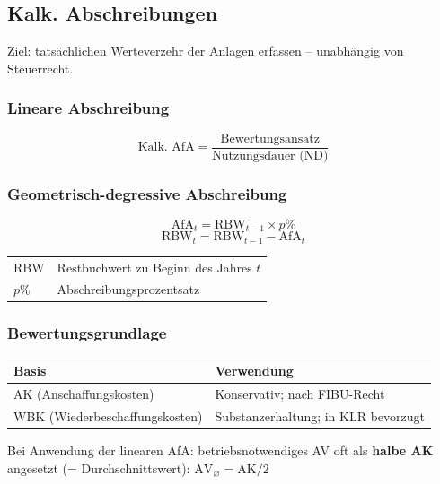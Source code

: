 \documentclass[10pt,a4paper]{article}
\begin{document}
\begin{multicols}{2}

\subsection{Kalk. Abschreibungen}

Ziel: tatsächlichen Werteverzehr der Anlagen erfassen -- unabhängig von Steuerrecht.

\subsubsection{Lineare Abschreibung}
\begin{formelbox}
\[
\text{Kalk. AfA} = \frac{\text{Bewertungsansatz}}{\text{Nutzungsdauer (ND)}}
\]
\end{formelbox}

\subsubsection{Geometrisch-degressive Abschreibung}
\begin{formelbox}
\[
\text{AfA}_t = \text{RBW}_{t-1} \times p\%
\]
\[
\text{RBW}_t = \text{RBW}_{t-1} - \text{AfA}_t
\]
\end{formelbox}

\begin{tabular}{|L{2cm}|L{5cm}|}
\hline
RBW & Restbuchwert zu Beginn des Jahres $t$ \\
$p\%$ & Abschreibungsprozentsatz \\
\hline
\end{tabular}

\subsubsection{Bewertungsgrundlage}
\begin{tabular}{|L{3.2cm}|L{3.6cm}|}
\hline
{}
\textbf{Basis} & \textbf{Verwendung} \\
\hline
AK (Anschaffungs\-kosten) & Konservativ; nach FIBU-Recht \\
WBK (Wieder\-beschaffungs\-kosten) & Substanzerhaltung; in KLR bevorzugt \\
\hline
\end{tabular}

\vspace{4pt}
\begin{hinweisbox}
Bei Anwendung der linearen AfA: betriebsnotwendiges AV oft als \textbf{halbe AK} angesetzt (= Durchschnittswert): $\text{AV}_\varnothing = \text{AK}/2$
\end{hinweisbox}


\end{multicols}
\end{document}
